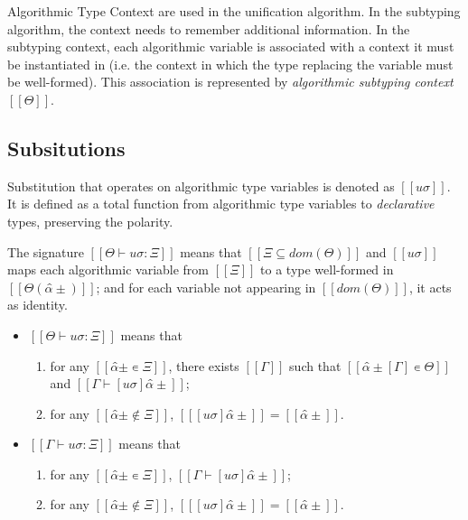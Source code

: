 \documentclass[acmsmall,natbib=false,review,anonymous]{acmart}
\begin{document}
Algorithmic Type Context are used in the unification algorithm.
In the subtyping algorithm, 
the context needs to remember additional information.
In the subtyping context, each algorithmic variable is associated with a
context it must be instantiated in 
(i.e. the context in which the type replacing the variable must be well-formed).
This association is represented by \emph{algorithmic subtyping context} $[[Θ]]$.


\subsection{Subsitutions}

Substitution that operates on algorithmic type variables is denoted as
$[[uσ]]$. It is defined as a total function from algorithmic 
type variables to \emph{declarative} types, preserving the polarity.

The signature $[[Θ ⊢ uσ : Ξ]]$ means that
$[[Ξ ⊆ dom(Θ)]]$ and 
$[[uσ]]$ maps each algorithmic variable 
from $[[Ξ]]$ to a type well-formed in $[[Θ(α̂±)]]$;
and for each variable not appearing in $[[dom(Θ)]]$, 
it acts as identity.

\begin{definition}
  \label{def:algo-subst-sig}
  \hfill
  \begin{itemize}
    \item $[[Θ ⊢ uσ : Ξ]]$ means that
      \begin{enumerate}
        \item for any $[[α̂± ∊ Ξ]]$,
          there exists $[[Γ]]$ such that $[[ α̂±[Γ] ∊ Θ ]]$
          and $[[ Γ ⊢ [uσ]α̂± ]]$; 
        \item for any $[[ α̂± ∉ Ξ]]$, $[[ [uσ]α̂± ]] =  [[ α̂± ]]$.
      \end{enumerate}
    \item $[[Γ ⊢ uσ : Ξ]]$ means that
      \begin{enumerate}
        \item for any $[[α̂± ∊ Ξ]]$, $[[ Γ ⊢ [uσ]α̂± ]]$; 
        \item for any $[[ α̂± ∉ Ξ]]$, $[[ [uσ]α̂± ]] =  [[ α̂± ]]$.
      \end{enumerate}
  \end{itemize}
\end{definition}
\end{document}
